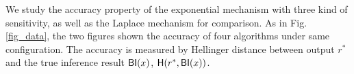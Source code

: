 We study the accuracy property of the exponential mechanism with three kind of sensitivity, as well as the Laplace mechanism for comparison. As in Fig. \ref{fig_data}, the two figures shown the accuracy of four algorithms under same configuration. The accuracy is measured by Hellinger distance between output $r^*$ and the true inference result $\mathsf{BI}(x)$, $\mathsf{H}(r^*, \mathsf{BI}(x))$.



\printbibliography




